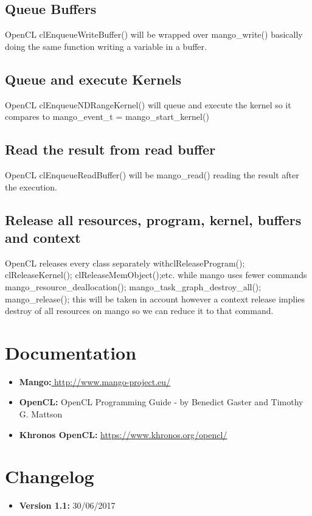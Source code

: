 \documentclass[a4paper]{article}
\begin{document}
\subsection{Queue Buffers}
OpenCL \ttfamily clEnqueueWriteBuffer() \rmfamily will be wrapped over \ttfamily mango\_write() \rmfamily basically doing the same function writing a variable in a buffer.
\subsection{Queue and execute Kernels}
OpenCL \ttfamily clEnqueueNDRangeKernel() \rmfamily will queue and execute the kernel so it compares to \ttfamily mango\_event\_t = mango\_start\_kernel() \rmfamily
\subsection{Read the result from read buffer}
OpenCL \ttfamily clEnqueueReadBuffer() \rmfamily will be \ttfamily mango\_read() \rmfamily reading the result after the execution.
\subsection{Release all resources, program, kernel, buffers and context}
OpenCL releases every class separately with\ttfamily clReleaseProgram(); clReleaseKernel(); clReleaseMemObject();\rmfamily etc. while mango uses fewer commands
\ttfamily mango\_resource\_deallocation(); 
mango\_task\_graph\_destroy\_all(); 
mango\_release(); \rmfamily this will be taken in account however a context release implies destroy of all resources on mango so we can reduce it to that command.

\newpage
\section{Documentation}
\begin{itemize}
	\item \textbf{Mango:}\url{ http://www.mango-project.eu/}
	\item \textbf{OpenCL:} OpenCL Programming Guide - by Benedict Gaster and Timothy G. Mattson
	\item \textbf{Khronos OpenCL:} \url{https://www.khronos.org/opencl/}
\end{itemize}
\newpage


\section{Changelog}
\begin{itemize}
\item \textbf {Version 1.1:} 30/06/2017
\end{itemize}
\end{document}
